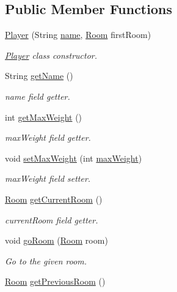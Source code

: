 \subsection*{Public Member Functions}
\begin{DoxyCompactItemize}
\item 
\hyperlink{classPlayer_aa0b4d27c6fa66ab36c3d870eb5f4709a}{Player} (String \hyperlink{classPlayer_aa70e75b3cc209ea82a17c469de0f159c}{name}, \hyperlink{classRoom}{Room} first\-Room)
\begin{DoxyCompactList}\small\item\em \hyperlink{classPlayer}{Player} class constructor. \end{DoxyCompactList}\item 
String \hyperlink{classPlayer_a7b17595bbe9876d4aa469ad9bee644dd}{get\-Name} ()
\begin{DoxyCompactList}\small\item\em name field getter. \end{DoxyCompactList}\item 
int \hyperlink{classPlayer_a29c09bad98b48579fec4321698e082d1}{get\-Max\-Weight} ()
\begin{DoxyCompactList}\small\item\em max\-Weight field getter. \end{DoxyCompactList}\item 
void \hyperlink{classPlayer_a000b1e49bc833a5cffc2a14441c01498}{set\-Max\-Weight} (int \hyperlink{classPlayer_ad1f36de0de5e6258b92ea5b8eda28edc}{max\-Weight})
\begin{DoxyCompactList}\small\item\em max\-Weight field setter. \end{DoxyCompactList}\item 
\hyperlink{classRoom}{Room} \hyperlink{classPlayer_a3a3107df50fc4e35e8c0f46c3f776ce6}{get\-Current\-Room} ()
\begin{DoxyCompactList}\small\item\em current\-Room field getter. \end{DoxyCompactList}\item 
void \hyperlink{classPlayer_a1f5329b83e67a4829a2a775bbb39b6fe}{go\-Room} (\hyperlink{classRoom}{Room} room)
\begin{DoxyCompactList}\small\item\em Go to the given room. \end{DoxyCompactList}\item 
\hyperlink{classRoom}{Room} \hyperlink{classPlayer_aae81c20b32496c3bc14882828fed4f1b}{get\-Previous\-Room} ()

\end{DoxyCompactItemize}

